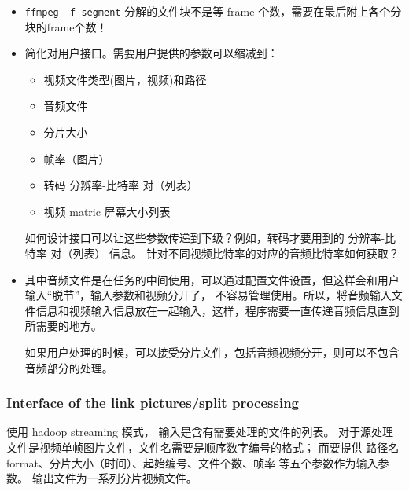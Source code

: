 \begin{itemize}
  \item \texttt{ffmpeg -f segment} 分解的文件块不是等 frame 个数，需要在最后附上各个分块的frame个数！
  \item 简化对用户接口。需要用户提供的参数可以缩减到：
    \begin{itemize}
      \item 视频文件类型(图片，视频)和路径
      \item 音频文件
      \item 分片大小
      \item 帧率（图片）
      \item 转码 分辨率-比特率 对（列表）
      \item 视频 matric 屏幕大小列表
    \end{itemize}
  如何设计接口可以让这些参数传递到下级？例如，转码才要用到的 分辨率-比特率 对（列表） 信息。
  针对不同视频比特率的对应的音频比特率如何获取？
  \item 其中音频文件是在任务的中间使用，可以通过配置文件设置，但这样会和用户输入``脱节''，输入参数和视频分开了，
  不容易管理使用。所以，将音频输入文件信息和视频输入信息放在一起输入，这样，程序需要一直传递音频信息直到所需要的地方。

  如果用户处理的时候，可以接受分片文件，包括音频视频分开，则可以不包含音频部分的处理。
\end{itemize}

\subsubsection{Interface of the link pictures/split processing}

使用 hadoop streaming 模式，
输入是含有需要处理的文件的列表。
对于源处理文件是视频单帧图片文件，文件名需要是顺序数字编号的格式；
而要提供 路径名format、分片大小（时间）、起始编号、文件个数、帧率 等五个参数作为输入参数。
输出文件为一系列分片视频文件。

